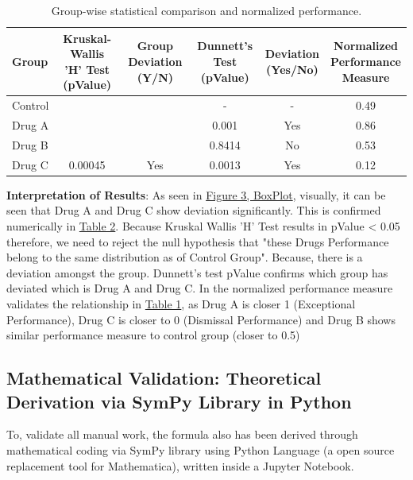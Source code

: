 \documentclass[a4paper,fleqn,review]{cas-sc}
\begin{document}
\begin{table}[h!tbp]
	\centering
	\label{table:results-simulated-data}
	\renewcommand{\arraystretch}{1.3}
	\begin{tabular}{lccccc}
		\toprule
		\textbf{Group} &
		\makecell{\textbf{Kruskal-Wallis} \\ \textbf{'H' Test (pValue)}} &
		\makecell{\textbf{Group} \\ \textbf{Deviation (Y/N)}} &
		\makecell{\textbf{Dunnett's} \\ \textbf{Test (pValue)}} &
		\makecell{\textbf{Deviation} \\ \textbf{(Yes/No)}} &
		\makecell{\textbf{Normalized} \\ \textbf{Performance} \\ \textbf{Measure}} \\
		\midrule
		Control &         &     & -      & -    & 0.49 \\
		Drug A  &         &     & 0.001  & Yes  & 0.86 \\
		Drug B  &         &     & 0.8414 & No   & 0.53 \\
		Drug C  & \multirow{-3}{*}{0.00045} & \multirow{-3}{*}{Yes} & 0.0013 & Yes & 0.12 \\
		\bottomrule
	\end{tabular}
	\vspace{5pt}
	\caption{Group-wise statistical comparison and normalized performance.}
	
\end{table}

\textbf{Interpretation of Results}:
As seen in  \hyperref[fig:box-plot]{Figure 3, BoxPlot}, visually, it can be seen that Drug A and Drug C show deviation significantly. This is confirmed numerically in \hyperref[table:results-simulated-data]{Table 2}. Because Kruskal Wallis 'H' Test results in pValue < 0.05 therefore, we need to reject the null hypothesis that "these Drugs Performance belong to the same distribution as of Control Group". Because, there is a deviation amongst the group. Dunnett's test pValue confirms which group has deviated which is Drug A and Drug C. In the normalized performance measure validates the relationship in \hyperref[table:p-value-relationship]{Table 1}, as Drug A is closer 1 (Exceptional Performance), Drug C is closer to 0 (Dismissal Performance) and Drug B shows similar performance measure to control group (closer to 0.5)

\subsection{Mathematical Validation: Theoretical Derivation via SymPy Library in Python}
To, validate all manual work, the formula also has been derived through mathematical coding via SymPy library using Python Language (a open source replacement tool for Mathematica), written inside a Jupyter Notebook.
\end{document}
